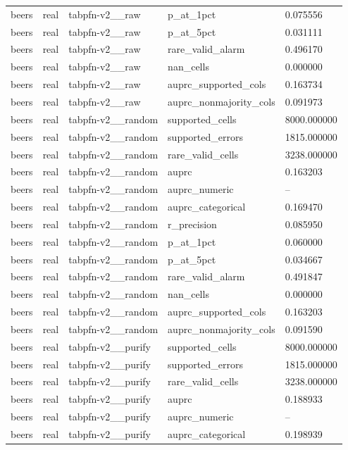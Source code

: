 \begin{tabular}{lllll}
beers & real & tabpfn-v2\_\_raw & p\_at\_1pct & 0.075556 \\
beers & real & tabpfn-v2\_\_raw & p\_at\_5pct & 0.031111 \\
beers & real & tabpfn-v2\_\_raw & rare\_valid\_alarm & 0.496170 \\
beers & real & tabpfn-v2\_\_raw & nan\_cells & 0.000000 \\
beers & real & tabpfn-v2\_\_raw & auprc\_supported\_cols & 0.163734 \\
beers & real & tabpfn-v2\_\_raw & auprc\_nonmajority\_cols & 0.091973 \\
beers & real & tabpfn-v2\_\_random & supported\_cells & 8000.000000 \\
beers & real & tabpfn-v2\_\_random & supported\_errors & 1815.000000 \\
beers & real & tabpfn-v2\_\_random & rare\_valid\_cells & 3238.000000 \\
beers & real & tabpfn-v2\_\_random & auprc & 0.163203 \\
beers & real & tabpfn-v2\_\_random & auprc\_numeric & -- \\
beers & real & tabpfn-v2\_\_random & auprc\_categorical & 0.169470 \\
beers & real & tabpfn-v2\_\_random & r\_precision & 0.085950 \\
beers & real & tabpfn-v2\_\_random & p\_at\_1pct & 0.060000 \\
beers & real & tabpfn-v2\_\_random & p\_at\_5pct & 0.034667 \\
beers & real & tabpfn-v2\_\_random & rare\_valid\_alarm & 0.491847 \\
beers & real & tabpfn-v2\_\_random & nan\_cells & 0.000000 \\
beers & real & tabpfn-v2\_\_random & auprc\_supported\_cols & 0.163203 \\
beers & real & tabpfn-v2\_\_random & auprc\_nonmajority\_cols & 0.091590 \\
beers & real & tabpfn-v2\_\_purify & supported\_cells & 8000.000000 \\
beers & real & tabpfn-v2\_\_purify & supported\_errors & 1815.000000 \\
beers & real & tabpfn-v2\_\_purify & rare\_valid\_cells & 3238.000000 \\
beers & real & tabpfn-v2\_\_purify & auprc & 0.188933 \\
beers & real & tabpfn-v2\_\_purify & auprc\_numeric & -- \\
beers & real & tabpfn-v2\_\_purify & auprc\_categorical & 0.198939 \\

\end{tabular}
